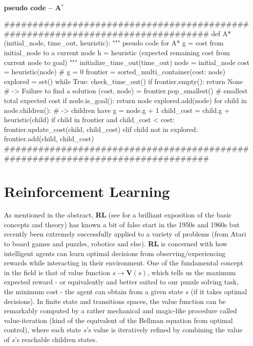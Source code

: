 \paragraph{}{\textbf{pseudo code -- A$^{*}$}}
\begin{pseudocode}
###############################################################################
def A*(initial_node, time_out, heuristic):
    """ pseudo code for A*
    g = cost from initial_node to a current node
    h = heuristic (expected remaining cost from current node to goal)
    """
    initialize_time_out(time_out)
    node = initial_node
    cost = heuristic(node) # g = 0
    frontier = sorted_multi_container({cost: {node}})
    explored = set()
    while True:
        check_time_out()
        if frontier.empty():
            return None # -> Failure to find a solution
        (cost, node) = frontier.pop_smallest() # smallest total expected cost
        if node.is_goal():
            return node
        explored.add(node)
        for child in node.children(): # -> children have g = node.g + 1
            child_cost = child.g + heuristic(child)
            if child in frontier and child_cost < cost:
                frontier.update_cost(child, child_cost)
            elif child not in explored:
                frontier.add(child, child_cost)
###############################################################################
\end{pseudocode}
\black



\section{Reinforcement Learning}
\label{sec:RLTheory}

As mentioned in the abstract, \textbf{RL} (see \cite{Sutton1998} for a brilliant exposition of the basic concepts and theory) has known a bit of false start in the 1950s and 1960s but recently been extremely successfully applied to a variety of problems (from Atari to board games and puzzles, robotics and else). \textbf{RL} is concerned with how intelligent agents can learn optimal decisions from observing/experiencing rewards while interacting in their environment. One of the fundamental concept in the field is that of value function $s \to \textbf{V}(s)$, which tells us the maximum expected reward - or equivalently and better suited to our puzzle solving task, the minimum cost - the agent can obtain from a given state $s$ (if it takes optimal decisions). In finite state and transitions spaces, the value function can be remarkably computed by a rather mechanical and magic-like procedure called value-iteration (kind of the equivalent of the Bellman equation from optimal control), where each state $s$'s value is iteratively refined by combining the value of $s$'s reachable children states.
\teal
